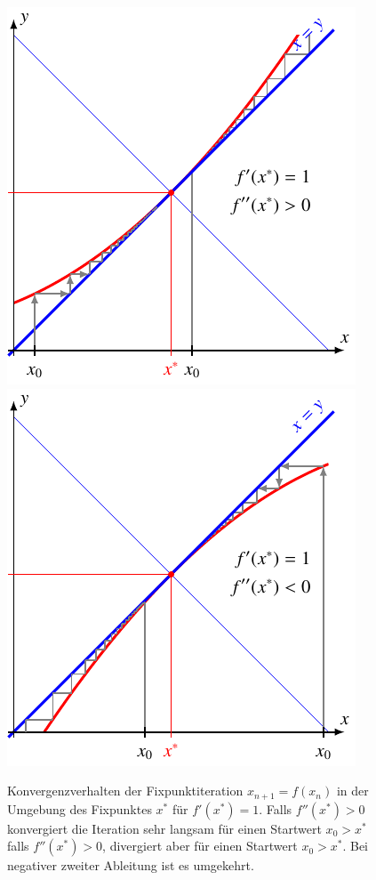 \begin{figure}
\centering
\includegraphics{chapters/10-arithmetik/figures/m1qp.pdf}
\includegraphics{chapters/10-arithmetik/figures/m1qn.pdf}
\caption{Konvergenzverhalten der Fixpunktiteration $x_{n+1}=f(x_n)$
in der Umgebung des Fixpunktes $x^*$ für $f'(x^*)=1$.
Falls $f''(x^*)>0$ konvergiert die Iteration sehr langsam
für einen Startwert $x_0>x^*$ falls $f''(x^*)>0$, divergiert
aber für einen Startwert $x_0>x^*$. 
Bei negativer zweiter Ableitung ist es umgekehrt.
\label{buch:figure:fixpunkt:abl1}}
\end{figure}
